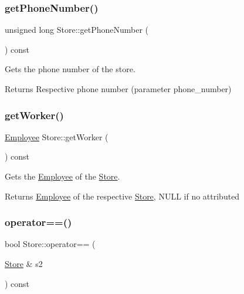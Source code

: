 \subsubsection{\texorpdfstring{get\+Phone\+Number()}{getPhoneNumber()}}
{\footnotesize\ttfamily unsigned long Store\+::get\+Phone\+Number (\begin{DoxyParamCaption}{ }\end{DoxyParamCaption}) const}



Gets the phone number of the store. 

\begin{DoxyReturn}{Returns}
Respective phone number (parameter phone\+\_\+number) 
\end{DoxyReturn}
\mbox{\label{class_store_ab4b4d6e958e7d26398f3e6e0e932c920}} 
\subsubsection{\texorpdfstring{get\+Worker()}{getWorker()}}
{\footnotesize\ttfamily \hyperlink{class_employee}{Employee} Store\+::get\+Worker (\begin{DoxyParamCaption}{ }\end{DoxyParamCaption}) const}



Gets the \hyperlink{class_employee}{Employee} of the \hyperlink{class_store}{Store}. 

\begin{DoxyReturn}{Returns}
\hyperlink{class_employee}{Employee} of the respective \hyperlink{class_store}{Store}, N\+U\+LL if no attributed 
\end{DoxyReturn}
\mbox{\label{class_store_a4dfd27a0615f161f2f0e94297bb54969}} 
\subsubsection{\texorpdfstring{operator==()}{operator==()}}
{\footnotesize\ttfamily bool Store\+::operator== (\begin{DoxyParamCaption}\item[{\hyperlink{class_store}{Store} \&}]{s2 }\end{DoxyParamCaption}) const}



